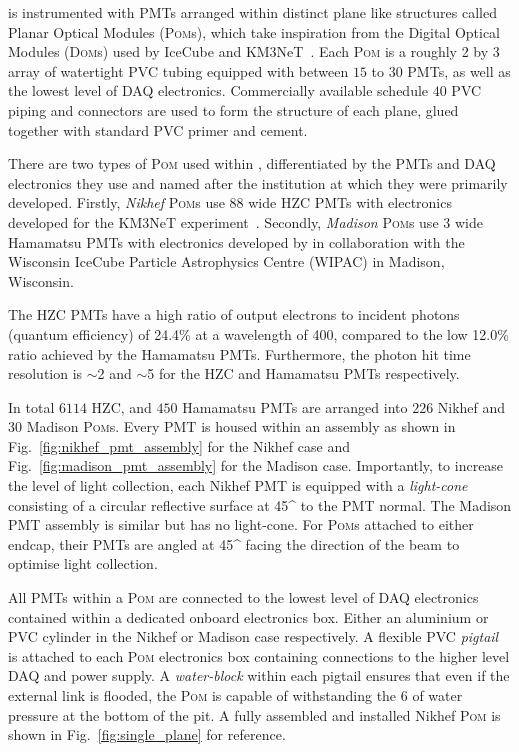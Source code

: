 \chipsfive is instrumented with PMTs arranged within distinct plane like structures called Planar
Optical Modules (\textsc{Pom}s), which take inspiration from the Digital Optical Modules
(\textsc{Dom}s) used by IceCube and KM3NeT~\cite{hanson2006, eijk2015}. Each \textsc{Pom} is a
roughly \unit{2}{} by \unit{3}{} array of watertight PVC tubing equipped with
between $15$ to $30$ PMTs, as well as the lowest level of DAQ electronics. Commercially available
schedule $40$ PVC piping and connectors are used to form the structure of each plane, glued
together with standard PVC primer and cement.

There are two types of \textsc{Pom} used within \chipsfive, differentiated by the PMTs and DAQ
electronics they use and named after the institution at which they were primarily developed.
Firstly, \emph{Nikhef} \textsc{Pom}s use \unit{88}{} wide HZC PMTs with electronics
developed for the KM3NeT experiment~\cite{katz2009, adrian2016}. Secondly, \emph{Madison}
\textsc{Pom}s use \unit{3}{} wide Hamamatsu PMTs with electronics developed by \chips
in collaboration with the Wisconsin IceCube Particle Astrophysics Centre (WIPAC) in Madison,
Wisconsin.

The HZC PMTs have a high ratio of output electrons to incident photons (quantum efficiency) of
24.4\% at a wavelength of \unit{400}{}, compared to the low 12.0\% ratio achieved by the
Hamamatsu PMTs. Furthermore, the photon hit time resolution is $\sim$\unit{2}{} and
$\sim$\unit{5}{} for the HZC and Hamamatsu PMTs respectively.

In total $6114$ HZC, and $450$ Hamamatsu PMTs are arranged into $226$ Nikhef and $30$ Madison
\textsc{Pom}s. Every PMT is housed within an assembly as shown in
Fig.~\ref{fig:nikhef_pmt_assembly} for the Nikhef case and Fig.~\ref{fig:madison_pmt_assembly} for
the Madison case. Importantly, to increase the level of light collection, each Nikhef PMT is
equipped with a \emph{light-cone} consisting of a circular reflective surface at \unit{45}{^\circ}
to the PMT normal. The Madison PMT assembly is similar but has no light-cone. For \textsc{Pom}s
attached to either endcap, their PMTs are angled at \unit{45}{^\circ} facing the direction of the
beam to optimise light collection.

All PMTs within a \textsc{Pom} are connected to the lowest level of DAQ electronics contained
within a dedicated onboard electronics box. Either an aluminium or PVC cylinder in the Nikhef or
Madison case respectively. A flexible PVC \emph{pigtail} is attached to each \textsc{Pom}
electronics box containing connections to the higher level DAQ and power supply. A
\emph{water-block} within each pigtail ensures that even if the external link is flooded, the
\textsc{Pom} is capable of withstanding the \unit{6}{} of water pressure at the bottom
of the pit. A fully assembled and installed Nikhef \textsc{Pom} is shown in
Fig.~\ref{fig:single_plane} for reference.


